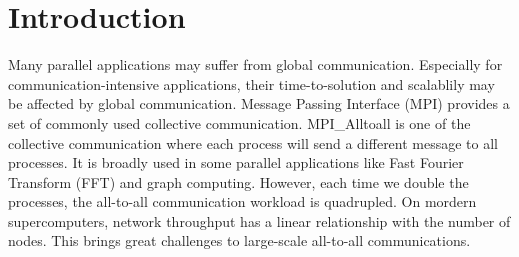 \section{Introduction}




Many parallel applications may suffer from global communication.
Especially for communication-intensive applications, their time-to-solution and scalablily may be affected by global communication. 
Message Passing Interface (MPI) provides a set of commonly used collective communication.
MPI\_Alltoall is one of the collective communication where each process will send a different message to all processes.
It is broadly used in some parallel applications like Fast Fourier Transform (FFT) and graph computing.
However, each time we double the processes, the all-to-all communication workload is quadrupled.
On mordern supercomputers, network throughput has a linear relationship with the number of nodes.
This brings great challenges to large-scale all-to-all communications.

